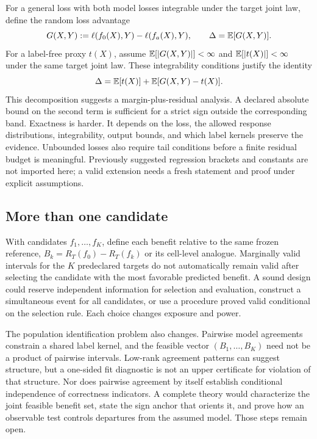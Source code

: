 For a general loss with both model losses integrable under the target joint law,
define the random loss advantage
\begin{equation}
  G(X,Y):=\ell(f_0(X),Y)-\ell(f_a(X),Y),
  \qquad
  \Delta=\mathbb{E}[G(X,Y)].
  \label{fr:eq-general-loss-advantage}
\end{equation}
For a label-free proxy $t(X)$, assume $\mathbb{E}[|G(X,Y)|]<\infty$ and
$\mathbb{E}[|t(X)|]<\infty$ under the same target joint law.  These integrability
conditions justify the identity
\begin{equation}
  \Delta=\mathbb{E}[t(X)]+\mathbb{E}[G(X,Y)-t(X)].
  \label{fr:eq-general-loss-decomposition}
\end{equation}
This decomposition suggests a margin-plus-residual analysis.  A declared absolute bound on the second term is sufficient
for a strict sign outside the corresponding band.  Exactness is harder.  It depends on the loss,
the allowed response distributions, integrability, output bounds, and which label kernels preserve
the evidence.  Unbounded losses also require tail conditions before a finite residual budget is
meaningful.  Previously suggested regression brackets and constants are not imported here; a valid
extension needs a fresh statement and proof under explicit assumptions.

\subsection{More than one candidate}
\label{fr:subsec-multiple-candidates-open}

With candidates $f_1,\ldots,f_K$, define each benefit relative to the same frozen reference,
$B_k=R_T(f_0)-R_T(f_k)$ or its cell-level analogue.  Marginally valid intervals for the $K$
predeclared targets do not automatically remain valid after selecting the candidate with the most
favorable predicted benefit.  A sound design could reserve independent information for selection
and evaluation, construct a simultaneous event for all candidates, or use a procedure proved valid
conditional on the selection rule.  Each choice changes exposure and power.

The population identification problem also changes.  Pairwise model agreements constrain a shared
label kernel, and the feasible vector $(B_1,\ldots,B_K)$ need not be a product of pairwise intervals.
Low-rank agreement patterns can suggest structure, but a one-sided fit diagnostic is not an upper
certificate for violation of that structure.  Nor does pairwise agreement by itself establish
conditional independence of correctness indicators.  A complete theory would characterize the
joint feasible benefit set, state the sign anchor that orients it, and prove how an observable test
controls departures from the assumed model.  Those steps remain open.

